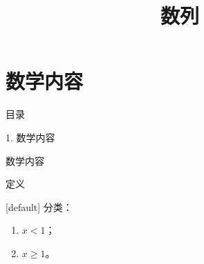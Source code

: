 \documentclass[aspectratio=169,10pt,fontset=fandol]{ctexbeamer}
\title{数列}
\begin{document}
\section{数学内容}
\begin{frame}[t,fragile]{目录}
\normalsize
{\color{blue}\normalsize 1. 数学内容\par}\vspace{0.22em}
\end{frame}
\begin{frame}[t,fragile]{数学内容}
\normalsize
\begin{block}{定义}
{\normalsize
{}[default]
分类：\begin{enumerate}[(1)]\item $x<1$；\item $x\geq1$。\end{enumerate}
}
\end{block}
\end{frame}
\end{document}
